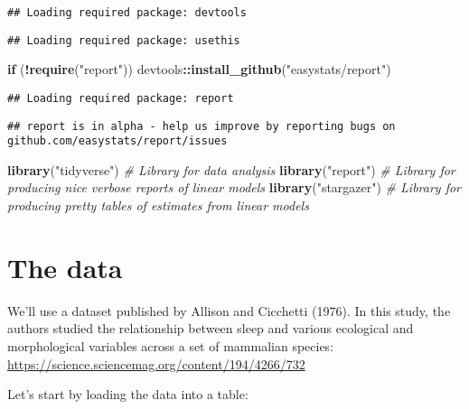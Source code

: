 \documentclass[
]{book}
\newenvironment{Shaded}{\begin{snugshade}}{\end{snugshade}}
\newcommand{\CommentTok}[1]{\textcolor[rgb]{0.56,0.35,0.01}{\textit{#1}}}
\newcommand{\ControlFlowTok}[1]{\textcolor[rgb]{0.13,0.29,0.53}{\textbf{#1}}}
\newcommand{\KeywordTok}[1]{\textcolor[rgb]{0.13,0.29,0.53}{\textbf{#1}}}
\newcommand{\NormalTok}[1]{#1}
\newcommand{\OperatorTok}[1]{\textcolor[rgb]{0.81,0.36,0.00}{\textbf{#1}}}
\newcommand{\StringTok}[1]{\textcolor[rgb]{0.31,0.60,0.02}{#1}}
\begin{document}
\begin{verbatim}
## Loading required package: devtools
\end{verbatim}

\begin{verbatim}
## Loading required package: usethis
\end{verbatim}

\begin{Shaded}
\begin{Highlighting}[]
\ControlFlowTok{if}\NormalTok{ (}\OperatorTok{!}\KeywordTok{require}\NormalTok{(}\StringTok{"report"}\NormalTok{)) devtools}\OperatorTok{::}\KeywordTok{install\_github}\NormalTok{(}\StringTok{"easystats/report"}\NormalTok{)}
\end{Highlighting}
\end{Shaded}

\begin{verbatim}
## Loading required package: report
\end{verbatim}

\begin{verbatim}
## report is in alpha - help us improve by reporting bugs on github.com/easystats/report/issues
\end{verbatim}

\begin{Shaded}
\begin{Highlighting}[]
\KeywordTok{library}\NormalTok{(}\StringTok{"tidyverse"}\NormalTok{) }\CommentTok{\# Library for data analysis}
\KeywordTok{library}\NormalTok{(}\StringTok{"report"}\NormalTok{) }\CommentTok{\# Library for producing nice verbose reports of linear models}
\KeywordTok{library}\NormalTok{(}\StringTok{"stargazer"}\NormalTok{) }\CommentTok{\# Library for producing pretty tables of estimates from linear models}
\end{Highlighting}
\end{Shaded}

\hypertarget{the-data}{%
\section{The data}\label{the-data}}

We'll use a dataset published by Allison and Cicchetti (1976). In this study, the authors studied the relationship between sleep and various ecological and morphological variables across a set of mammalian species:
\url{https://science.sciencemag.org/content/194/4266/732}

Let's start by loading the data into a table:
\end{document}
